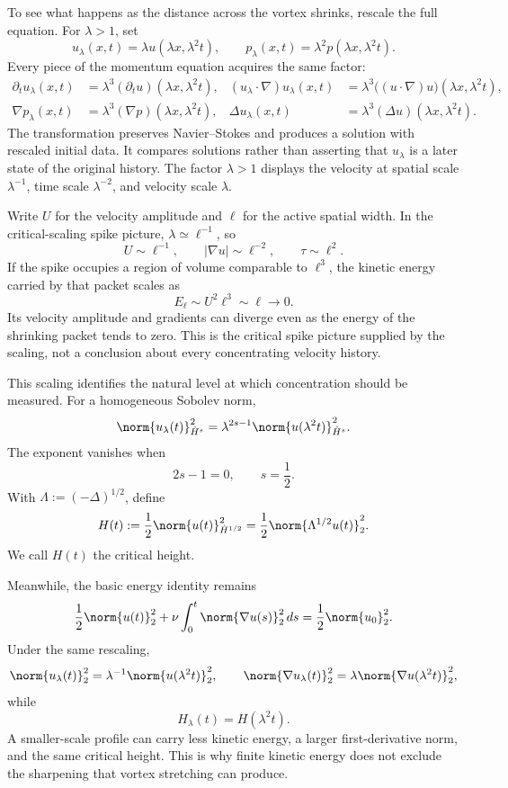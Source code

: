 To see what happens as the distance across the vortex shrinks, rescale the full equation.
For \(\lambda>1\), set
\[
  u_\lambda(x,t)=\lambda u(\lambda x,\lambda^2t),
  \qquad
  p_\lambda(x,t)=\lambda^2p(\lambda x,\lambda^2t).
\]
Every piece of the momentum equation acquires the same factor:
\[
\begin{aligned}
  \partial_tu_\lambda(x,t)
  &=\lambda^3(\partial_tu)(\lambda x,\lambda^2t),
  &
  (u_\lambda\cdot\nabla)u_\lambda(x,t)
  &=\lambda^3\bigl((u\cdot\nabla)u\bigr)(\lambda x,\lambda^2t),
  \\
  \nabla p_\lambda(x,t)
  &=\lambda^3(\nabla p)(\lambda x,\lambda^2t),
  &
  \Delta u_\lambda(x,t)
  &=\lambda^3(\Delta u)(\lambda x,\lambda^2t).
\end{aligned}
\]
The transformation preserves Navier--Stokes and produces a solution with rescaled initial data.
It compares solutions rather than asserting that \(u_\lambda\) is a later state of the original history.
The factor \(\lambda>1\) displays the velocity at spatial scale \(\lambda^{-1}\), time scale \(\lambda^{-2}\), and velocity scale \(\lambda\).

Write \(U\) for the velocity amplitude and \(\ell\) for the active spatial width.
In the critical-scaling spike picture, \(\lambda\simeq\ell^{-1}\), so
\[
  U\sim\ell^{-1},
  \qquad
  |\nabla u|\sim\ell^{-2},
  \qquad
  \tau\sim\ell^2.
\]
If the spike occupies a region of volume comparable to \(\ell^3\), the kinetic energy carried by that packet scales as
\[
  E_\ell\sim U^2\ell^3\sim\ell\longrightarrow0.
\]
Its velocity amplitude and gradients can diverge even as the energy of the shrinking packet tends to zero.
This is the critical spike picture supplied by the scaling, not a conclusion about every concentrating velocity history.

This scaling identifies the natural level at which concentration should be measured.
For a homogeneous Sobolev norm,
\[
  \norm{u_\lambda(t)}_{\dot H^s}^2
  =\lambda^{2s-1}
  \norm{u(\lambda^2t)}_{\dot H^s}^2.
\]
The exponent vanishes when
\[
  2s-1=0,
  \qquad
  s=\frac12.
\]
With \(\Lambda:=(-\Delta)^{1/2}\), define
\begin{equation}\label{eq:BodyCriticalHeightDefinition}
  H(t)
  :=\frac12\norm{u(t)}_{\dot H^{1/2}}^2
  =\frac12\norm{\Lambda^{1/2}u(t)}_2^2.
\end{equation}
We call \(H(t)\) the critical height.

Meanwhile, the basic energy identity remains
\begin{equation}\label{eq:BodyEnergyIdentity}
  \frac12\norm{u(t)}_2^2
  +\nu\int_0^t\norm{\nabla u(s)}_2^2\,ds
  =\frac12\norm{u_0}_2^2.
\end{equation}
Under the same rescaling,
\[
  \norm{u_\lambda(t)}_2^2
  =\lambda^{-1}\norm{u(\lambda^2t)}_2^2,
  \qquad
  \norm{\nabla u_\lambda(t)}_2^2
  =\lambda\norm{\nabla u(\lambda^2t)}_2^2,
\]
while
\[
  H_\lambda(t)=H(\lambda^2t).
\]
A smaller-scale profile can carry less kinetic energy, a larger first-derivative norm, and the same critical height.
This is why finite kinetic energy does not exclude the sharpening that vortex stretching can produce.

